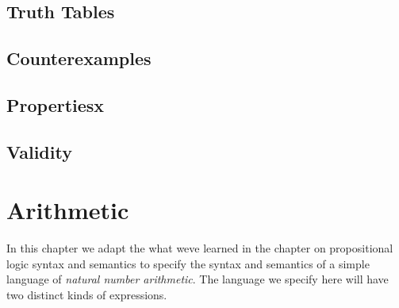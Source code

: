 \documentclass{book}
\begin{document}
\hypertarget{book__pandoc__debug__src__dmt1__lectures__l03_modeltheory__truthtable.lean.md}{}
\hypertarget{book__pandoc__debug__src__dmt1__lectures__l03_modeltheory__truthtable.lean.md__truth-tables}{%
\section{Truth Tables}\label{book__pandoc__debug__src__dmt1__lectures__l03_modeltheory__truthtable.lean.md__truth-tables}}

\hypertarget{book__pandoc__debug__src__dmt1__lectures__l03_modeltheory__counterexamples.lean.md}{}
\hypertarget{book__pandoc__debug__src__dmt1__lectures__l03_modeltheory__counterexamples.lean.md__counterexamples}{%
\section{Counterexamples}\label{book__pandoc__debug__src__dmt1__lectures__l03_modeltheory__counterexamples.lean.md__counterexamples}}

\hypertarget{book__pandoc__debug__src__dmt1__lectures__l03_modeltheory__properties.lean.md}{}
\hypertarget{book__pandoc__debug__src__dmt1__lectures__l03_modeltheory__properties.lean.md__propertiesx}{%
\section{Propertiesx}\label{book__pandoc__debug__src__dmt1__lectures__l03_modeltheory__properties.lean.md__propertiesx}}

\hypertarget{book__pandoc__debug__src__dmt1__lectures__l03_modeltheory__validity.lean.md}{}
\hypertarget{book__pandoc__debug__src__dmt1__lectures__l03_modeltheory__validity.lean.md__validity}{%
\section{Validity}\label{book__pandoc__debug__src__dmt1__lectures__l03_modeltheory__validity.lean.md__validity}}

\hypertarget{book__pandoc__debug__src__arithmetic.md}{}
\hypertarget{book__pandoc__debug__src__arithmetic.md__arithmetic}{%
\chapter{Arithmetic}\label{book__pandoc__debug__src__arithmetic.md__arithmetic}}

In this chapter we adapt the what we\textquotesingle ve learned in the
chapter on propositional logic syntax and semantics to
specify the syntax and semantics of a simple language of
\emph{natural number arithmetic}. The language we specify here
will have two distinct kinds of expressions.
\end{document}
